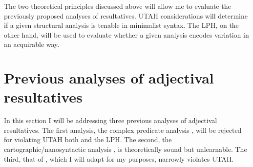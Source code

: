 \documentclass[MilwayThesis]{subfiles}
\begin{document}
%
%
%
%
%
%
The two theoretical principles discussed above will allow me to evaluate the previously proposed analyses of resultatives.
UTAH considerations will determine if a given structural analysis is tenable in minimalist syntax.
The LPH, on the other hand, will be used to evaluate whether a given analysis encodes variation in an acquirable way.

\section{Previous analyses of adjectival resultatives}
In this section I will be addressing three previous analyses of adjectival resultatives.
The first analysis, the complex predicate analysis \parencite{snyder1995language,irimia2012secondary}, will be rejected for violating UTAH both and the LPH.
The second, the cartographic/nanosyntactic analysis \parencite{son2008microparameters}, is theoretically sound but unlearnable.
The third, that of \textcite{kratzer2004building}, which I will adapt for my purposes, narrowly violates UTAH.
\end{document}
